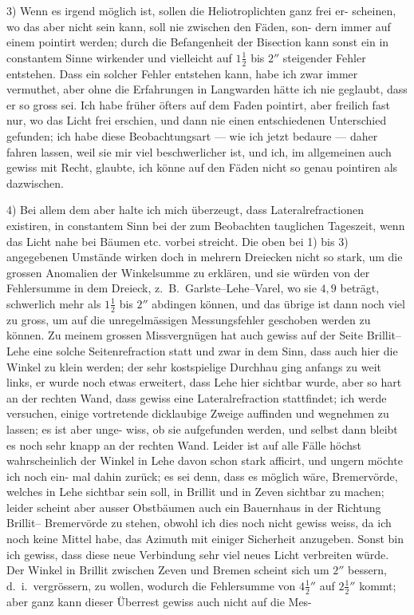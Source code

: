 \documentclass[12pt,a4paper]{article}
\theoremstyle{plain}
\theoremstyle{definition}
\theoremstyle{remark}
\begin{document}
3) Wenn es irgend möglich ist, sollen die Heliotroplichten ganz frei er-
scheinen, wo das aber nicht sein kann, soll nie zwischen den Fäden, son-
dern immer auf einem pointirt werden; durch die Befangenheit der Bisection
kann sonst ein in constantem Sinne wirkender und vielleicht auf $1\frac{1}{2}$ bis $2''$
steigender Fehler entstehen. Dass ein solcher Fehler entstehen kann, habe
ich zwar immer vermuthet, aber ohne die Erfahrungen in Langwarden hätte
ich nie geglaubt, dass er so gross sei. Ich habe früher öfters auf dem Faden
pointirt, aber freilich fast nur, wo das Licht frei erschien, und dann nie einen
entschiedenen Unterschied gefunden; ich habe diese Beobachtungsart --- wie
ich jetzt bedaure --- daher fahren lassen, weil sie mir viel beschwerlicher
ist, und ich, im allgemeinen auch gewiss mit Recht, glaubte, ich könne
auf den Fäden nicht so genau pointiren als dazwischen.

4) Bei allem dem aber halte ich mich überzeugt, dass Lateralrefractionen
existiren, in constantem Sinn bei der zum Beobachten tauglichen Tageszeit,
wenn das Licht nahe bei Bäumen etc. vorbei streicht. Die oben bei 1) bis 3)
angegebenen Umstände wirken doch in mehrern Dreiecken nicht so stark, um
die grossen Anomalien der Winkelsumme zu erklären, und sie würden von der
Fehlersumme in dem Dreieck, z.\ B.\ Garlste--Lehe--Varel, wo sie $4{,}9$ beträgt,
schwerlich mehr als $1\frac{1}{2}$ bis $2''$ abdingen können, und das übrige ist dann
noch viel zu gross, um auf die unregelmässigen Messungsfehler geschoben
werden zu können. Zu meinem grossen Missvergnügen hat auch gewiss auf
der Seite Brillit--Lehe eine solche Seitenrefraction statt und zwar in dem
Sinn, dass auch hier die Winkel zu klein werden; der sehr kostspielige
Durchhau ging anfangs zu weit links, er wurde noch etwas erweitert, dass
Lehe hier sichtbar wurde, aber so hart an der rechten Wand, dass gewiss
eine Lateralrefraction stattfindet; ich werde versuchen, einige vortretende
dicklaubige Zweige auffinden und wegnehmen zu lassen; es ist aber unge-
wiss, ob sie aufgefunden werden, und selbst dann bleibt es noch sehr knapp
an der rechten Wand. Leider ist auf alle Fälle höchst wahrscheinlich der
Winkel in Lehe davon schon stark afficirt, und ungern möchte ich noch ein-
mal dahin zurück; es sei denn, dass es möglich wäre, Bremervörde, welches
in Lehe sichtbar sein soll, in Brillit und in Zeven sichtbar zu machen; leider
scheint aber ausser Obstbäumen auch ein Bauernhaus in der Richtung Brillit--
Bremervörde zu stehen, obwohl ich dies noch nicht gewiss weiss, da ich noch
keine Mittel habe, das Azimuth mit einiger Sicherheit anzugeben. Sonst bin
ich gewiss, dass diese neue Verbindung sehr viel neues Licht verbreiten
würde. Der Winkel in Brillit zwischen Zeven und Bremen scheint sich um
$2''$ bessern, d.\ i.\ vergrössern, zu wollen, wodurch die Fehlersumme von $4\frac{1}{2}''$ auf
$2\frac{1}{2}''$ kommt; aber ganz kann dieser Überrest gewiss auch nicht auf die Mes-
\end{document}
